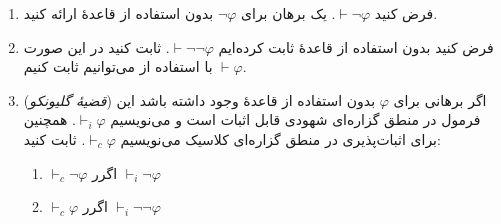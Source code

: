 \begin{enumerate}[label=(\alph*)]
    \item فرض کنید $\vdash\neg\varphi$. یک برهان برای $\neg\varphi$ بدون استفاده از قاعدهٔ  ارائه کنید.
    \item فرض کنید بدون استفاده از قاعدهٔ  ثابت کرده‌ایم $\vdash\neg\neg\varphi$. ثابت کنید در این صورت با استفاده از  می‌توانیم ثابت کنیم $\vdash\varphi$.
    \item(\emph{قضیهٔ گلیونکو}) اگر برهانی برای $\varphi$ بدون استفاده از قاعدهٔ  وجود داشته باشد این فرمول در منطق گزاره‌ای شهودی قابل اثبات است و می‌نویسیم $\vdash_i\varphi$. همچنین برای اثبات‌پذیری در منطق گزاره‌ای کلاسیک می‌نویسیم $\vdash_c\varphi$. ثابت کنید:
    \begin{enumerate}[label=(\roman*)]
        \item $\vdash_c\neg\varphi$ اگرر $\vdash_i\neg\varphi$
        \item $\vdash_c\varphi$ اگرر $\vdash_i\neg\neg\varphi$
    \end{enumerate}
\end{enumerate}